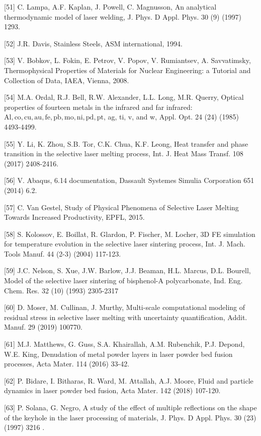 \documentclass[10pt]{article}
\begin{document}
[51] C. Lampa, A.F. Kaplan, J. Powell, C. Magnusson, An analytical thermodynamic model of laser welding, J. Phys. D Appl. Phys. 30 (9) (1997) 1293.

[52] J.R. Davis, Stainless Steels, ASM international, 1994.

[53] V. Bobkov, L. Fokin, E. Petrov, V. Popov, V. Rumiantsev, A. Savvatimsky, Thermophysical Properties of Materials for Nuclear Engineering: a Tutorial and Collection of Data, IAEA, Vienna, 2008.

[54] M.A. Ordal, R.J. Bell, R.W. Alexander, L.L. Long, M.R. Querry, Optical properties of fourteen metals in the infrared and far infrared: $\mathrm{Al}, \mathrm{co}, \mathrm{cu}, \mathrm{au}, \mathrm{fe}, \mathrm{pb}, \mathrm{mo}, \mathrm{ni}, \mathrm{pd}, \mathrm{pt}$, ag, ti, v, and w, Appl. Opt. 24 (24) (1985) 4493-4499.

[55] Y. Li, K. Zhou, S.B. Tor, C.K. Chua, K.F. Leong, Heat transfer and phase transition in the selective laser melting process, Int. J. Heat Mass Transf. 108 (2017) 2408-2416.

[56] V. Abaqus, 6.14 documentation, Dassault Systemes Simulia Corporation 651 (2014) 6.2.

[57] C. Van Gestel, Study of Physical Phenomena of Selective Laser Melting Towards Increased Productivity, EPFL, 2015.

[58] S. Kolossov, E. Boillat, R. Glardon, P. Fischer, M. Locher, 3D FE simulation for temperature evolution in the selective laser sintering process, Int. J. Mach. Tools Manuf. 44 (2-3) (2004) 117-123.

[59] J.C. Nelson, S. Xue, J.W. Barlow, J.J. Beaman, H.L. Marcus, D.L. Bourell, Model of the selective laser sintering of bisphenol-A polycarbonate, Ind. Eng. Chem. Res. 32 (10) (1993) 2305-2317

[60] D. Moser, M. Cullinan, J. Murthy, Multi-scale computational modeling of residual stress in selective laser melting with uncertainty quantification, Addit. Manuf. 29 (2019) 100770.

[61] M.J. Matthews, G. Guss, S.A. Khairallah, A.M. Rubenchik, P.J. Depond, W.E. King, Denudation of metal powder layers in laser powder bed fusion processes, Acta Mater. 114 (2016) 33-42.

[62] P. Bidare, I. Bitharas, R. Ward, M. Attallah, A.J. Moore, Fluid and particle dynamics in laser powder bed fusion, Acta Mater. 142 (2018) 107-120.

[63] P. Solana, G. Negro, A study of the effect of multiple reflections on the shape of the keyhole in the laser processing of materials, J. Phys. D Appl. Phys. 30 (23) (1997) 3216 .
\end{document}
